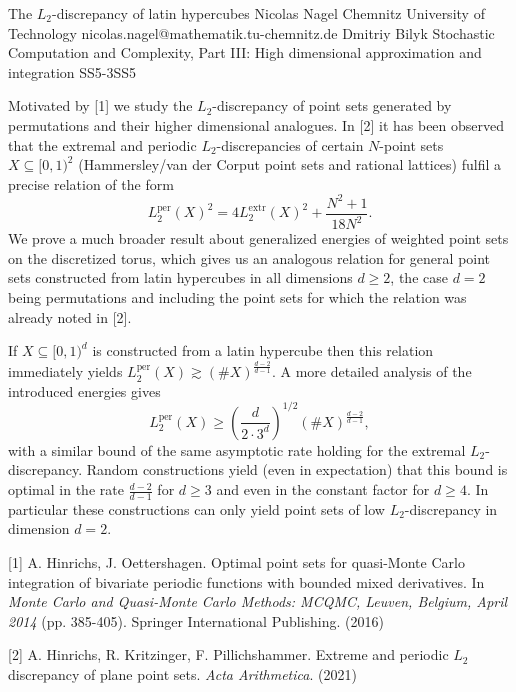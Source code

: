 	\begin{talk}
		{The $L_2$-discrepancy of latin hypercubes}%
		{Nicolas Nagel}%
		{Chemnitz University of Technology}%
		{nicolas.nagel@mathematik.tu-chemnitz.de}%
		{Dmitriy Bilyk}%
{Stochastic Computation and Complexity, Part III: High dimensional approximation and integration}
{}{SS5-3}{SS5}

		
		
		
		
		Motivated by [1] we study the $L_2$-discrepancy of point sets generated by permutations and their higher dimensional analogues. In [2] it has been observed that the extremal and periodic $L_2$-discrepancies of certain $N$-point sets $X \subseteq [0, 1)^2$ (Hammersley/van der Corput point sets and rational lattices) fulfil a precise relation of the form
		$$
		L_2^\text{per}(X)^2 = 4 L_2^\text{extr}(X)^2 + \frac{N^2+1}{18N^2}.
		$$
		We prove a much broader result about generalized energies of weighted point sets on the discretized torus, which gives us an analogous relation for general point sets constructed from latin hypercubes in all dimensions $d \geq 2$, the case $d = 2$ being permutations and including the point sets for which the relation was already noted in [2].
		
		If $X \subseteq [0, 1)^d$ is constructed from a latin hypercube then this relation immediately yields $L_2^\text{per}(X) \gtrsim (\#X)^{\frac{d-2}{d-1}}$. A more detailed analysis of the introduced energies gives
		$$
		L_2^\text{per} (X) \geq \left(\frac{d}{2 \cdot 3^d}\right)^{1/2} (\#X)^{\frac{d-2}{d-1}},
		$$
		with a similar bound of the same asymptotic rate holding for the extremal $L_2$-discrepancy. Random constructions yield (even in expectation) that this bound is optimal in the rate $\frac{d-2}{d-1}$ for $d \geq 3$ and even in the constant factor for $d \geq 4$. In particular these constructions can only yield point sets of low $L_2$-discrepancy in dimension $d = 2$.
		
		\medskip
		
		[1] A. Hinrichs, J. Oettershagen. Optimal point sets for quasi-Monte Carlo integration of bivariate periodic functions with bounded mixed derivatives. In \textit{Monte Carlo and Quasi-Monte Carlo Methods: MCQMC, Leuven, Belgium, April 2014} (pp. 385-405). Springer International Publishing. (2016)
		
		[2] A. Hinrichs, R. Kritzinger, F. Pillichshammer. Extreme and periodic $L_2$ discrepancy of plane point sets. \textit{Acta Arithmetica}. (2021)
	\end{talk}

